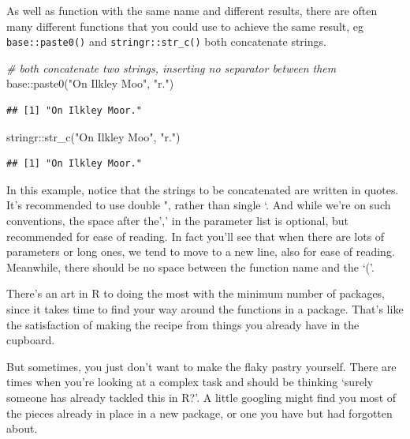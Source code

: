 \documentclass[
]{book}
\newenvironment{Shaded}{\begin{snugshade}}{\end{snugshade}}
\newcommand{\CommentTok}[1]{\textcolor[rgb]{0.56,0.35,0.01}{\textit{#1}}}
\newcommand{\FunctionTok}[1]{\textcolor[rgb]{0.00,0.00,0.00}{#1}}
\newcommand{\NormalTok}[1]{#1}
\newcommand{\SpecialCharTok}[1]{\textcolor[rgb]{0.00,0.00,0.00}{#1}}
\newcommand{\StringTok}[1]{\textcolor[rgb]{0.31,0.60,0.02}{#1}}
\begin{document}
As well as function with the same name and different results, there are often many different functions that you could use to achieve the same result, eg \texttt{base::paste0()} and \texttt{stringr::str\_c()} both concatenate strings.

\begin{Shaded}
\begin{Highlighting}[]
\CommentTok{\# both concatenate two strings, inserting no separator between them}
\NormalTok{base}\SpecialCharTok{::}\FunctionTok{paste0}\NormalTok{(}\StringTok{"On Ilkley Moo"}\NormalTok{, }\StringTok{"r."}\NormalTok{)}
\end{Highlighting}
\end{Shaded}

\begin{verbatim}
## [1] "On Ilkley Moor."
\end{verbatim}

\begin{Shaded}
\begin{Highlighting}[]
\NormalTok{stringr}\SpecialCharTok{::}\FunctionTok{str\_c}\NormalTok{(}\StringTok{"On Ilkley Moo"}\NormalTok{, }\StringTok{"r."}\NormalTok{)}
\end{Highlighting}
\end{Shaded}

\begin{verbatim}
## [1] "On Ilkley Moor."
\end{verbatim}

In this example, notice that the strings to be concatenated are written in quotes. It's recommended to use double ", rather than single `. And while we're on such conventions, the space after the',' in the parameter list is optional, but recommended for ease of reading. In fact you'll see that when there are lots of parameters or long ones, we tend to move to a new line, also for ease of reading. Meanwhile, there should be no space between the function name and the `('.

There's an art in R to doing the most with the minimum number of packages, since it takes time to find your way around the functions in a package. That's like the satisfaction of making the recipe from things you already have in the cupboard.

But sometimes, you just don't want to make the flaky pastry yourself. There are times when you're looking at a complex task and should be thinking `surely someone has already tackled this in R?'. A little googling might find you most of the pieces already in place in a new package, or one you have but had forgotten about.
\end{document}
